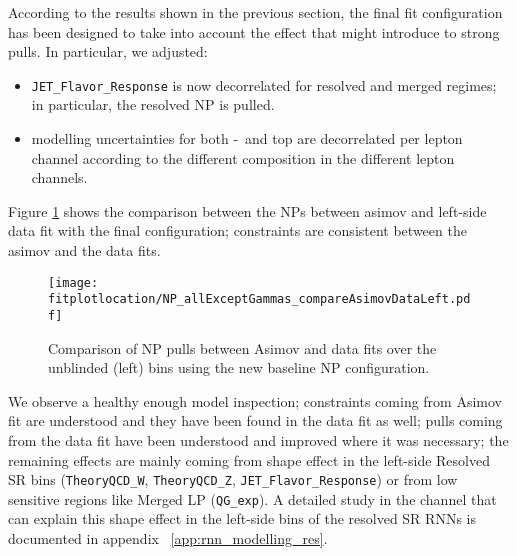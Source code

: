 \clearpage

According to the results shown in the previous section, the final fit configuration has been designed 
to take into account the effect that might introduce to strong pulls.
In particular, we adjusted:

\begin{itemize}
  \item \texttt{JET\_Flavor\_Response} is now decorrelated for resolved and merged regimes; 
  in particular, the resolved NP is pulled.
  \item modelling uncertainties for both \Wjets-\Zjets \ and top are decorrelated per lepton channel 
  according to the different composition in the different lepton channels.
\end{itemize}

\clearpage
Figure \ref{fig:NPbase_compare_AsimovData} shows the comparison between the NPs between asimov and left-side data fit
with the final configuration; constraints are consistent between the asimov and the data fits.

\begin{figure}[ht]
  \centering
        \texttt{[image: \\fitplotlocation/NP\_allExceptGammas\_compareAsimovDataLeft.pdf]}
	\caption{Comparison of NP pulls between Asimov and data fits over the unblinded (left) bins using the new baseline NP configuration.}
  \label{fig:NPbase_compare_AsimovData}
\end{figure}

We observe a healthy enough model inspection; constraints coming from Asimov fit are understood 
and they have been found in the data fit as well; pulls coming from the data fit have been understood
and improved where it was necessary; the remaining effects are mainly coming from shape effect in the 
left-side Resolved SR bins (\texttt{TheoryQCD\_W}, \texttt{TheoryQCD\_Z}, \texttt{JET\_Flavor\_Response}) 
or from low sensitive regions like Merged LP (\texttt{QG\_exp}). A detailed study in the \olep 
channel that can explain this shape effect in the left-side bins of the resolved SR RNNs is documented
in appendix ~\ref{app:rnn_modelling_res}.


